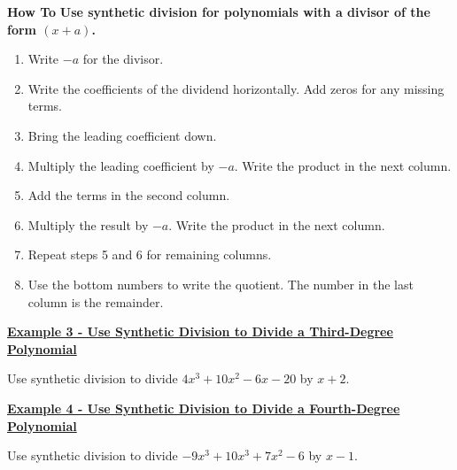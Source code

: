 \documentclass[12pt]{book}
\begin{document}
\newpage

\begin{boxR}
    \textbf{How To}
    \vspace{1mm}
    \hline
    \vspace{2mm}
    \textbf{Use synthetic division for polynomials with a divisor of the form $(x+a)$.}
    \begin{enumerate}
        \item Write $-a$ for the divisor.
        \item Write the coefficients of the dividend horizontally. Add zeros for any missing terms. 
        \item Bring the leading coefficient down. 
        \item Multiply the leading coefficient by $-a$. Write the product in the next column.
        \item Add the terms in the second column. 
        \item Multiply the result by $-a$. Write the product in the next column. 
        \item Repeat steps 5 and 6 for remaining columns. 
        \item Use the bottom numbers to write the quotient. The number in the last column is the remainder. 
    \end{enumerate}
\end{boxR}
\bigskip 

\underline{\textbf{Example 3 - Use Synthetic Division to Divide a Third-Degree Polynomial}}

Use synthetic division to divide $4x^3+10x^2-6x-20$ by $x+2$.

\newpage

\underline{\textbf{Example 4 - Use Synthetic Division to Divide a Fourth-Degree Polynomial}}

Use synthetic division to divide $-9x^3+10x^3+7x^2-6$ by $x-1$.
\end{document}
